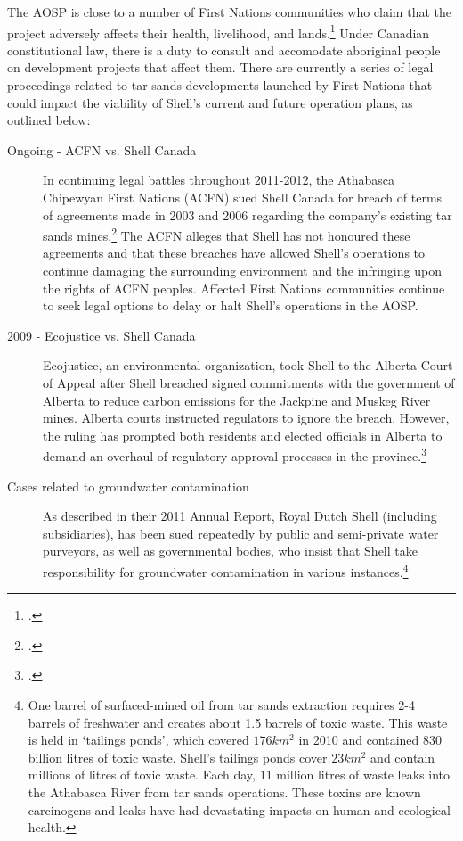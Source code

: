 The AOSP is close to a number of First Nations communities who claim that the project adversely affects their health, livelihood, and lands.\footcite[][]{RiskingRuin_2012}  
Under Canadian constitutional law, there is a duty to consult and accomodate aboriginal people on development projects that affect them.
There are currently a series of legal proceedings related to tar sands developments launched by First Nations that could impact the viability of Shell's current and future operation plans, as outlined below:
\begin{description}
	\item [Ongoing - ACFN vs. Shell Canada] In continuing legal battles throughout 2011-2012, the Athabasca Chipewyan First Nations (ACFN) sued Shell Canada for breach of terms of agreements made in 2003 and 2006 regarding the company's existing tar sands mines.\footcite{FNSues} The ACFN alleges that Shell has not honoured these agreements and that these breaches have allowed Shell's operations to continue damaging the surrounding environment and the infringing upon the rights of ACFN peoples. Affected First Nations communities continue to seek legal options to delay or halt Shell's operations in the AOSP.
	\item [2009 - Ecojustice vs. Shell Canada] Ecojustice, an environmental organization, took Shell to the Alberta Court of Appeal after Shell breached signed commitments with the government of Alberta to reduce carbon emissions for the Jackpine and Muskeg River mines. Alberta courts instructed regulators to ignore the breach. However, the ruling has prompted both residents and elected officials in Alberta to demand an overhaul of regulatory approval processes in the province.\footcite[][]{RiskingRuin_2012}
	\item [Cases related to groundwater contamination] As described in their 2011 Annual Report, Royal Dutch Shell (including subsidiaries), has been sued repeatedly by public and semi-private water purveyors, as well as governmental bodies, who insist that Shell take responsibility for groundwater contamination in various instances.\footnote{One barrel of surfaced-mined oil from tar sands extraction requires 2-4 barrels of freshwater and creates about 1.5 barrels of toxic waste. This waste is held in `tailings ponds', which covered $176 km^2$ in 2010 and contained 830 billion litres of toxic waste. Shell's tailings ponds cover $23 km^2$ and contain millions of litres of toxic waste. Each day, 11 million litres of waste leaks into the Athabasca River from tar sands operations. These toxins are known carcinogens and leaks have had devastating impacts on human and ecological health.} 

\end{description}
